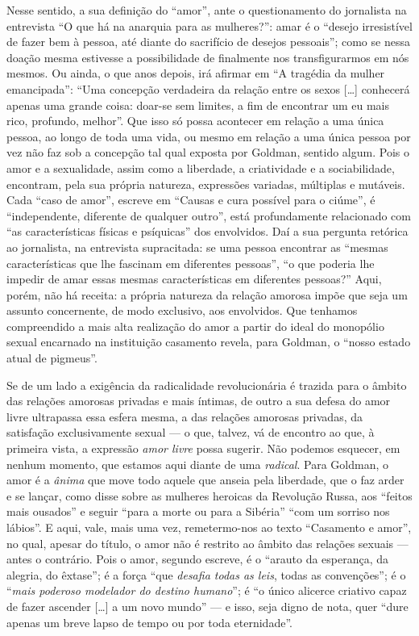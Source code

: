 Nesse sentido, a sua definição do ``amor'',
ante o questionamento do jornalista na entrevista ``O que há na anarquia
para as mulheres?'': amar é o ``desejo irresistível de fazer bem à
pessoa, até diante do sacrifício de desejos pessoais''; como se nessa
doação mesma estivesse a possibilidade de finalmente nos transfigurarmos
em nós mesmos. Ou ainda, o que anos depois, irá afirmar em ``A tragédia
da mulher emancipada'': ``Uma concepção verdadeira da relação entre os
sexos {[}\ldots{]} conhecerá apenas uma grande coisa: doar-se sem limites,
a fim de encontrar um eu mais rico, profundo, melhor''. Que isso só
possa acontecer em relação a uma única pessoa, ao longo de toda uma
vida, ou mesmo em relação a uma única pessoa por vez não faz sob a
concepção tal qual exposta por Goldman, sentido algum. Pois o amor e a
sexualidade, assim como a liberdade, a criatividade e a sociabilidade,
encontram, pela sua própria natureza, expressões variadas, múltiplas e
mutáveis. Cada ``caso de amor'', escreve em ``Causas e cura possível
para o ciúme'', é ``independente, diferente de qualquer outro'', está
profundamente relacionado com ``as características físicas e psíquicas''
dos envolvidos. Daí a sua pergunta retórica ao jornalista, na entrevista
supracitada: se uma pessoa encontrar as ``mesmas características que lhe
fascinam em diferentes pessoas'', ``o que poderia lhe impedir de amar
essas mesmas características em diferentes pessoas?'' Aqui, porém, não
há receita: a própria natureza da relação amorosa impõe que seja um
assunto concernente, de modo exclusivo, aos envolvidos. Que tenhamos
compreendido a mais alta realização do amor a partir do ideal do
monopólio sexual encarnado na instituição casamento revela, para
Goldman, o ``nosso estado atual de pigmeus''.

Se de um lado a exigência da radicalidade revolucionária é trazida para
o âmbito das relações amorosas privadas e mais íntimas, de outro a sua
defesa do amor livre ultrapassa essa esfera mesma, a das relações
amorosas privadas, da satisfação exclusivamente sexual --- o que, talvez,
vá de encontro ao que, à primeira vista, a expressão \textit{amor livre}
possa sugerir. Não podemos esquecer, em nenhum momento, que estamos aqui
diante de uma \textit{radical}. Para Goldman, o amor é a \textit{ânima} que
move todo aquele que anseia pela liberdade, que o faz arder e se lançar,
como disse sobre as mulheres heroicas da Revolução Russa, aos ``feitos
mais ousados'' ​​e seguir ``para a morte ou para a Sibéria'' ``com um
sorriso nos lábios''. E aqui, vale, mais uma vez, remetermo-nos ao texto
``Casamento e amor'', no qual, apesar do título, o amor não é
restrito ao âmbito das relações sexuais --- antes o contrário. Pois o
amor, segundo escreve, é o ``arauto da esperança, da alegria, do
êxtase''; é a força ``que \textit{desafia todas as leis}, todas as
convenções''; é o ``\textit{mais poderoso modelador do destino humano}'';
é ``o único alicerce criativo capaz de fazer ascender {[}\ldots{]} a um
novo mundo'' --- e isso, seja digno de nota, quer ``dure apenas um breve
lapso de tempo ou por toda eternidade''. 

